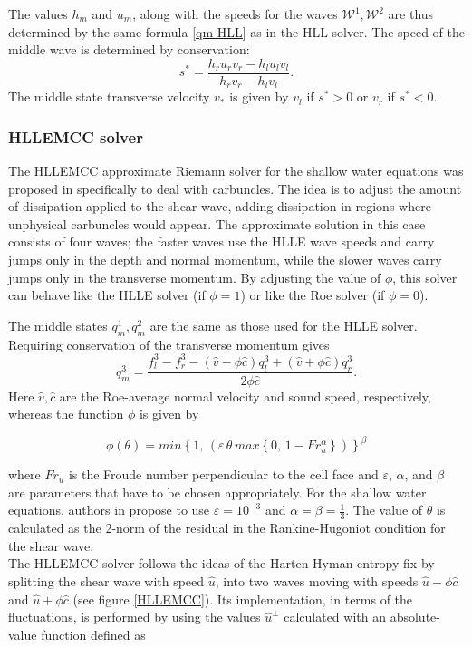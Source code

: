 \documentclass{article}
\newcommand{\W}{{\mathcal W}}
\begin{document}
The values $h_m$ and $u_m$, along with the speeds for the waves $\W^1,\W^2$ 
are thus determined by the same formula \eqref{qm-HLL} as in the HLL solver.
The speed of the middle wave is determined by conservation:
$$
    s^* = \frac{h_r u_r v_r - h_l u_l v_l}{h_r v_r - h_l v_l}.
$$
The middle state transverse velocity $v_*$ is given by $v_l$ if $s^*>0$ or $v_r$ if $s^*<0$.

\subsubsection{HLLEMCC solver}
The HLLEMCC approximate Riemann solver for the shallow water equations was proposed
in \cite{kemm2014note} specifically to deal with carbuncles.  The idea is to adjust
the amount of dissipation applied to the shear wave, adding dissipation in regions
where unphysical carbuncles would appear.  The approximate solution in this
case consists of four waves; the faster waves use the HLLE wave speeds and carry
jumps only in the depth and normal momentum, while the slower waves carry jumps
only in the transverse momentum.  By adjusting the value of $\phi$, this solver
can behave like the HLLE solver (if $\phi=1$) or like the Roe solver (if $\phi=0$).

The middle states $q^1_m, q^2_m$ are the same as those used for the HLLE solver.
Requiring conservation of the transverse momentum gives
$$
    q^3_m = \frac{f^3_l - f^3_r - (\hat{v}-\phi\hat{c})q^3_l + (\hat{v}+\phi\hat{c})q^3_r}{2\phi\hat{c}}.
$$
Here $\hat{v}, \hat{c}$ are the Roe-average normal velocity and sound speed, respectively, whereas the function $\phi$ is given by

\begin{equation}\label{if}
\phi(\theta)=min\left\lbrace 1,\, \left(\varepsilon\,\theta\,max\left\lbrace0,\,1-Fr_{u}^{\alpha} \right\rbrace \right)   \right\rbrace^{\beta}
\end{equation}

where $Fr_{u}$ is the Froude number perpendicular to the cell face and $\varepsilon$, $\alpha$, and $\beta$ are parameters that have to be chosen appropriately. For the shallow water equations, authors in \cite{kemm2014note} propose to use $\varepsilon=10^{-3}$ and $\alpha=\beta=\frac{1}{3}$. The value of $\theta$ is calculated as the 2-norm of the residual in the Rankine-Hugoniot condition for the shear wave.\\

The HLLEMCC solver follows the ideas of the Harten-Hyman entropy fix by splitting the shear wave with speed $\hat{u}$, into two waves moving with speeds $\hat{u}-\phi\hat{c}$ and $\hat{u}+\phi\hat{c}$ (see figure \ref{HLLEMCC}). Its implementation, in terms of the fluctuations, is performed by using the values $\hat{u}^{\pm}$ calculated with an absolute-value function defined as
\end{document}
